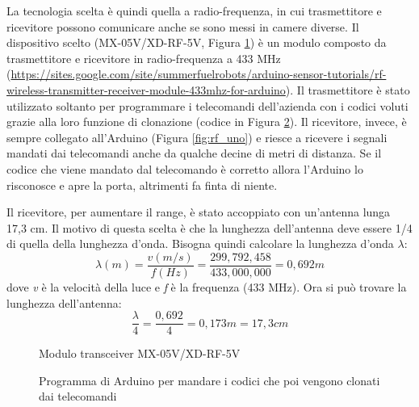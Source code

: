 \documentclass[12pt]{report}
\begin{document}
La tecnologia scelta è quindi quella a radio-frequenza, in cui trasmettitore e ricevitore possono comunicare anche se sono messi in camere diverse. Il dispositivo scelto (MX-05V/XD-RF-5V, Figura \ref{fig:rx_tx_module}) è un modulo composto da trasmettitore e ricevitore in radio-frequenza a 433 MHz (\url{https://sites.google.com/site/summerfuelrobots/arduino-sensor-tutorials/rf-wireless-transmitter-receiver-module-433mhz-for-arduino}). Il trasmettitore è stato utilizzato soltanto per programmare i telecomandi dell'azienda con i codici voluti grazie alla loro funzione di clonazione (codice in Figura \ref{fig:clone_code}). Il ricevitore, invece, è sempre collegato all'Arduino (Figura \ref{fig:rf_uno}) e riesce a ricevere i segnali mandati dai telecomandi anche da qualche decine di metri di distanza. Se il codice che viene mandato dal telecomando è corretto allora l'Arduino lo risconosce e apre la porta, altrimenti fa finta di niente. 


Il ricevitore, per aumentare il range, è stato accoppiato con un'antenna lunga 17,3 cm. Il motivo di questa scelta è che la lunghezza dell'antenna deve essere 1/4 di quella della lunghezza d'onda. Bisogna quindi calcolare la lunghezza d'onda $\lambda$:
%
\[\lambda(m) = \frac{v(m/s)}{f(Hz)} = \frac{299,792,458}{433,000,000} = 0,692 m\] 
%
dove \textit{v} è la velocità della luce e \textit{f} è la frequenza (433 MHz). Ora si può trovare la lunghezza dell'antenna: 
%
\[\frac{\lambda}{4} = \frac{0,692}{4} = 0,173m = 17,3 cm \]
%

\begin{figure}
	\caption{Modulo transceiver MX-05V/XD-RF-5V}
	\label{fig:rx_tx_module}
\end{figure}

\begin{figure}
	\caption{Programma di Arduino per mandare i codici che poi vengono clonati dai telecomandi}
	\label{fig:clone_code}
\end{figure}
\end{document}
